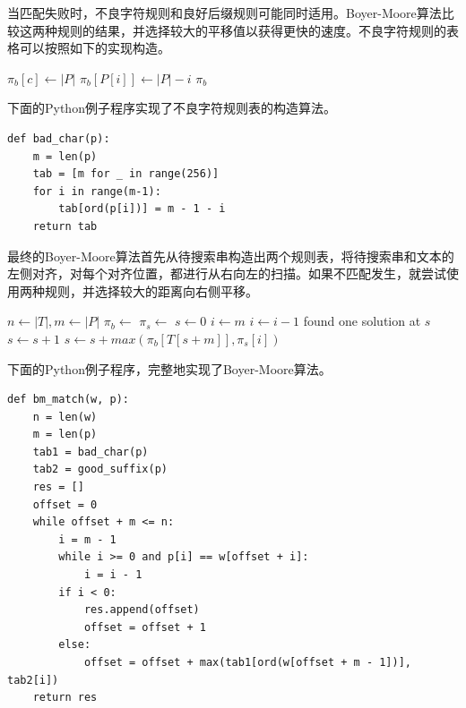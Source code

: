 \documentclass[UTF8]{article}
\begin{document}
当匹配失败时，不良字符规则和良好后缀规则可能同时适用。Boyer-Moore算法比较这两种规则的结果，并选择较大的平移值以获得更快的速度。不良字符规则的表格可以按照如下的实现构造。

\begin{algorithmic}[1]
    \State $\pi_b[c] \gets |P|$
  \EndFor
    \State $\pi_b[P[i]] \gets |P| - i$
  \EndFor
  \State \Return $\pi_b$
\EndFunction
\end{algorithmic}

下面的Python例子程序实现了不良字符规则表的构造算法。

\lstset{language=Python}
\begin{lstlisting}
def bad_char(p):
    m = len(p)
    tab = [m for _ in range(256)]
    for i in range(m-1):
        tab[ord(p[i])] = m - 1 - i
    return tab
\end{lstlisting}

最终的Boyer-Moore算法首先从待搜索串构造出两个规则表，将待搜索串和文本的左侧对齐，对每个对齐位置，都进行从右向左的扫描。如果不匹配发生，就尝试使用两种规则，并选择较大的距离向右侧平移。

\begin{algorithmic}[1]
  \State $n \gets |T|, m \gets |P|$
  \State $\pi_b \gets$ 
  \State $\pi_s \gets$ 
  \State $s \gets 0$
    \State $i \gets m$
      \State $i \gets i - 1$
    \EndWhile
      \State found one solution at $s$
      \State $s \gets s + 1$ 
    \Else
      \State $s \gets s + max(\pi_b[T[s + m]], \pi_s[i])$
    \EndIf
  \EndWhile
\EndFunction
\end{algorithmic}

下面的Python例子程序，完整地实现了Boyer-Moore算法。

\lstset{language=Python}
\begin{lstlisting}
def bm_match(w, p):
    n = len(w)
    m = len(p)
    tab1 = bad_char(p)
    tab2 = good_suffix(p)
    res = []
    offset = 0
    while offset + m <= n:
        i = m - 1
        while i >= 0 and p[i] == w[offset + i]:
            i = i - 1
        if i < 0:
            res.append(offset)
            offset = offset + 1
        else:
            offset = offset + max(tab1[ord(w[offset + m - 1])], tab2[i])
    return res
\end{lstlisting}
\end{document}
